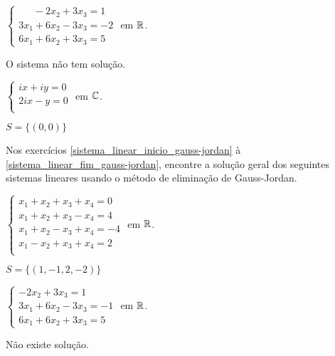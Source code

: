 \documentclass[12pt]{exam}
\begin{document}
\begin{exercicio}
    $
        \begin{cases}
            \phantom{2x_1} - 2x_2 + 3x_3 = 1\\
            3x_1 + 6x_2 - 3x_3 = -2\\
            6x_1 + 6x_2 + 3x_3 = 5
        \end{cases}
    $
    em $\mathbb{R}$.
    \begin{solucao}
        O sistema não tem solução.
    \end{solucao}
\end{exercicio}

\begin{exercicio}\label{sistema_linear_eliminacao}
    $
        \begin{cases}
            ix + iy = 0\\
            2ix - y = 0\\
        \end{cases}
    $
    em $\mathbb{C}$.
    \begin{solucao}
        $S = \{(0, 0)\}$
    \end{solucao}
\end{exercicio}

Nos exercícios \ref{sistema_linear_inicio_gauss-jordan} à \ref{sistema_linear_fim_gauss-jordan}, encontre a solução geral dos seguintes sistemas lineares usando o método de eliminação de Gauss-Jordan.

\begin{exercicio}\label{sistema_linear_inicio_gauss-jordan}
    $
        \begin{cases}
            x_1 + x_2 + x_3 + x_4 = 0\\
            x_1 + x_2 + x_3 - x_4 = 4\\
            x_1 + x_2 - x_3 + x_4 = -4\\
            x_1 - x_2 + x_3 + x_4 = 2\\
        \end{cases}
    $
    em $\mathbb{R}$.
    \begin{solucao}
        $S = \{(1, -1, 2, -2)\}$
    \end{solucao}
\end{exercicio}

\begin{exercicio}
    $
        \begin{cases}
            -2x_2 + 3x_3 = 1\\
            3x_1 + 6x_2 - 3x_3 = -1\\
            6x_1 + 6x_2 + 3x_3 = 5
        \end{cases}
    $
    em $\mathbb{R}$.
    \begin{solucao}
        Não existe solução.
    \end{solucao}
\end{exercicio}
\end{document}
